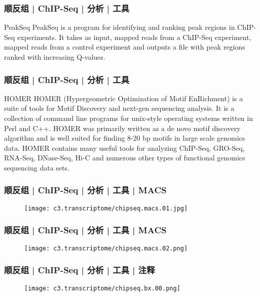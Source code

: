 \begin{frame}
  \frametitle{顺反组 | ChIP-Seq | 分析 | 工具}
  \begin{block}{PeakSeq}
    PeakSeq is a program for identifying and ranking peak regions in ChIP-Seq experiments. It takes as input, mapped reads from a ChIP-Seq experiment, mapped reads from a control experiment and outputs a file with peak regions ranked with increasing Q-values. 
  \end{block}
\end{frame}

\begin{frame}
  \frametitle{顺反组 | ChIP-Seq | 分析 | 工具}
  \begin{block}{HOMER}
    HOMER (Hypergeometric Optimization of Motif EnRichment) is a suite of tools for Motif Discovery and next-gen sequencing analysis.  It is a collection of command line programs for unix-style operating systems written in Perl and C++. HOMER was primarily written as a de novo motif discovery algorithm and is well suited for finding 8-20 bp motifs in large scale genomics data.  HOMER contains many useful tools for analyzing ChIP-Seq, GRO-Seq, RNA-Seq, DNase-Seq, Hi-C and numerous other types of functional genomics sequencing data sets.
  \end{block}
\end{frame}

\begin{frame}
  \frametitle{顺反组 | ChIP-Seq | 分析 | 工具 | MACS}
  \begin{figure}
    \centering
    \texttt{[image: c3.transcriptome/chipseq.macs.01.jpg]}
  \end{figure}
\end{frame}

\begin{frame}
  \frametitle{顺反组 | ChIP-Seq | 分析 | 工具 | MACS}
  \begin{figure}
    \centering
    \texttt{[image: c3.transcriptome/chipseq.macs.02.png]}
  \end{figure}
\end{frame}

\begin{frame}
  \frametitle{顺反组 | ChIP-Seq | 分析 | 工具 | 注释}
  \begin{figure}
    \centering
    \texttt{[image: c3.transcriptome/chipseq.bx.00.png]}
  \end{figure}
\end{frame}

